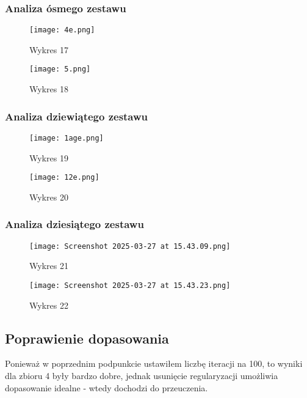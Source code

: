 \documentclass{article}
\begin{document}
\subsubsection{Analiza ósmego zestawu}
\begin{figure}[H]
    \centering
    \begin{minipage}{0.45\textwidth}
        \texttt{[image: 4e.png]}
        \caption{Wykres 17}
    \end{minipage}
    \hfill
    \begin{minipage}{0.45\textwidth}
        \texttt{[image: 5.png]}
        \caption{Wykres 18}
    \end{minipage}
\end{figure}

\subsubsection{Analiza dziewiątego zestawu}
\begin{figure}[H]
    \centering
    \begin{minipage}{0.45\textwidth}
        \texttt{[image: 1age.png]}
        \caption{Wykres 19}
    \end{minipage}
    \hfill
    \begin{minipage}{0.45\textwidth}
        \texttt{[image: 12e.png]}
        \caption{Wykres 20}
    \end{minipage}
\end{figure}

\subsubsection{Analiza dziesiątego zestawu}
\begin{figure}[H]
    \centering
    \begin{minipage}{0.45\textwidth}
        \texttt{[image: Screenshot 2025-03-27 at 15.43.09.png]}
        \caption{Wykres 21}
    \end{minipage}
    \hfill
    \begin{minipage}{0.45\textwidth}
        \texttt{[image: Screenshot 2025-03-27 at 15.43.23.png]}
        \caption{Wykres 22}
    \end{minipage}
\end{figure}

\subsection{Poprawienie dopasowania}
Ponieważ w poprzednim podpunkcie ustawiłem liczbę iteracji na 100, to wyniki dla zbioru 4 były bardzo dobre, jednak usunięcie regularyzacji umożliwia dopasowanie idealne - wtedy dochodzi do przeuczenia.
\end{document}
